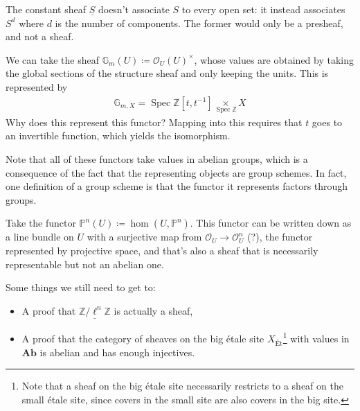 \begin{warnings}

The constant sheaf \(\underline{S}\) doesn't associate \(S\) to every
open set: it instead associates \(S^d\) where \(d\) is the number of
components. The former would only be a presheaf, and not a sheaf.

\end{warnings}

\begin{example}[?]

We can take the sheaf
\({\mathbb{G}}_m(U) \coloneqq{\mathcal{O}}_U(U)^{\times}\), whose values
are obtained by taking the global sections of the structure sheaf and
only keeping the units. This is represented by
\begin{align*}
{\mathbb{G}}_{m, X} = \operatorname{Spec}{\mathbb{Z}}[t, t^{-1}] \underset{\scriptscriptstyle {\operatorname{Spec}{\mathbb{Z}}} }{\times} X
\end{align*}
Why does this represent this functor? Mapping into this requires that
\(t\) goes to an invertible function, which yields the isomorphism.

\end{example}

\begin{remark}

Note that all of these functors take values in abelian groups, which is
a consequence of the fact that the representing objects are group
schemes. In fact, one definition of a group scheme is that the functor
it represents factors through groups.

\end{remark}

\begin{example}[?]

Take the functor \({\mathbb{P}}^n(U) \coloneqq\hom(U, {\mathbb{P}}^n)\).
This functor can be written down as a line bundle on \(U\) with a
surjective map from \({\mathcal{O}}_U \to {\mathcal{O}}_U^n\) (?), the
functor represented by projective space, and that's also a sheaf that is
necessarily representable but not an abelian one.

\end{example}

Some things we still need to get to:

\begin{itemize}
\tightlist
\item
  A proof that \(\underline{\mathbb{Z}/\ell^n\mathbb{Z}}\) is actually a
  sheaf,
\item
  A proof that the category of sheaves on the big étale site
  \(X_\text{Ét}\)\footnote{Note that a sheaf on the big étale site
    necessarily restricts to a sheaf on the small étale site, since
    covers in the small site are also covers in the big site.} with
  values in \(\mathbf{Ab}\) is abelian and has enough injectives.
\end{itemize}

